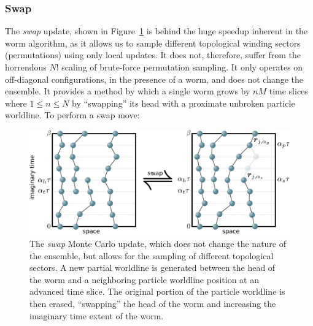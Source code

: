 \documentclass[prb,10pt,aps,floatfix,notitlepage]{revtex4-1}
\begin{document}
\subsubsection{Swap}
The \emph{swap} update, shown in Figure~\ref{fig:swap} is behind the huge
speedup inherent in the worm algorithm, as it allows us to sample different
topological winding sectors (permutations) using only local updates.  It does
not, therefore, suffer from the horrendous $N!$ scaling of brute-force
permutation sampling. It only operates on off-diagonal configurations, in the
presence of a worm, and does not change the ensemble. It provides a method by
which a single worm grows by $n M$ time slices where $1 \le n \le N$ by
``swapping'' its head with a proximate unbroken particle worldline.  To
perform a swap move:
%
\begin{figure}
\begin{center}
\includegraphics[width=0.70\columnwidth]{Figures/swap.pdf}
\end{center}
\caption{The \emph{swap} Monte Carlo update, which does not change the nature
of the ensemble, but allows for the sampling of different topological sectors.
A new partial worldline is generated between the head of the worm and a
neighboring particle worldline position at an advanced time slice.  The
original portion of the particle worldline is then erased, ``swapping'' the
head of the worm and increasing the imaginary time extent of the worm.}
\label{fig:swap}
 \end{figure}
%
\end{document}
